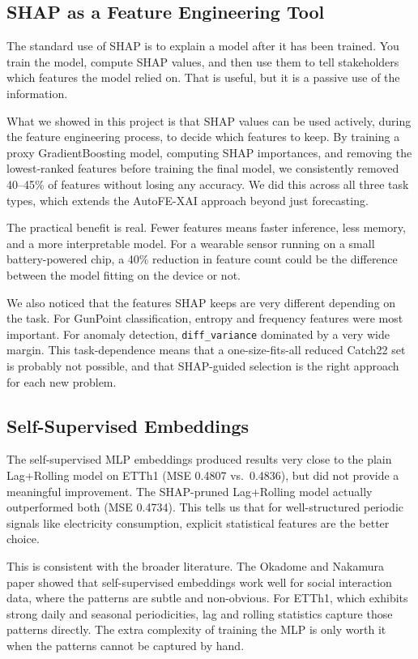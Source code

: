 \documentclass[10pt,conference]{IEEEtran}
\begin{document}
\subsection{SHAP as a Feature Engineering Tool}

The standard use of SHAP is to explain a model after it has been trained. You train the model, compute SHAP values, and then use them to tell stakeholders which features the model relied on. That is useful, but it is a passive use of the information.

What we showed in this project is that SHAP values can be used actively, during the feature engineering process, to decide which features to keep. By training a proxy GradientBoosting model, computing SHAP importances, and removing the lowest-ranked features before training the final model, we consistently removed 40--45\% of features without losing any accuracy. We did this across all three task types, which extends the AutoFE-XAI approach \cite{autofe_xai} beyond just forecasting.

The practical benefit is real. Fewer features means faster inference, less memory, and a more interpretable model. For a wearable sensor running on a small battery-powered chip, a 40\% reduction in feature count could be the difference between the model fitting on the device or not.

We also noticed that the features SHAP keeps are very different depending on the task. For GunPoint classification, entropy and frequency features were most important. For anomaly detection, \texttt{diff\_variance} dominated by a very wide margin. This task-dependence means that a one-size-fits-all reduced Catch22 set is probably not possible, and that SHAP-guided selection is the right approach for each new problem.

\subsection{Self-Supervised Embeddings}

The self-supervised MLP embeddings produced results very close to the plain Lag+Rolling model on ETTh1 (MSE 0.4807 vs.\ 0.4836), but did not provide a meaningful improvement. The SHAP-pruned Lag+Rolling model actually outperformed both (MSE 0.4734). This tells us that for well-structured periodic signals like electricity consumption, explicit statistical features are the better choice.

This is consistent with the broader literature. The Okadome and Nakamura paper \cite{lag_op} showed that self-supervised embeddings work well for social interaction data, where the patterns are subtle and non-obvious. For ETTh1, which exhibits strong daily and seasonal periodicities, lag and rolling statistics capture those patterns directly. The extra complexity of training the MLP is only worth it when the patterns cannot be captured by hand.
\end{document}
